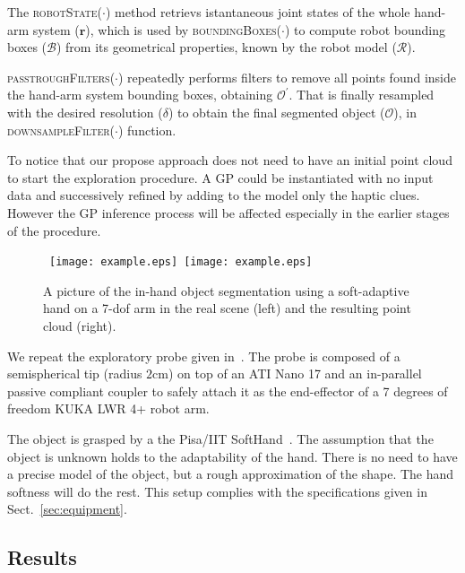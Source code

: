 The \textsc{robotState}($\cdot$) method retrievs istantaneous joint states
of the whole hand-arm system ($\mathbf{r}$), which is used by \textsc{boundingBoxes($\cdot$)} to compute robot bounding boxes ($\mathcal{B}$)
from its geometrical properties, known by the robot model ($\mathcal{R}$).

\textsc{passtroughFilters}($\cdot$) repeatedly performs filters to remove
all points found inside the hand-arm system bounding boxes, obtaining $\mathcal{O^\prime}$.
That is finally resampled with the desired resolution ($\delta$) 
to obtain the final segmented object ($\mathcal{O}$), in \textsc{downsampleFilter}($\cdot$) function.


To notice that our propose approach does not need to have an initial point cloud to start the exploration procedure. A GP could be instantiated with no input data and successively refined by adding to the model only the haptic clues. However the GP inference process will be affected especially in the earlier stages of the procedure.   

\begin{figure}
\centering
  \mbox{
  \texttt{[image: example.eps]}
  \texttt{[image: example.eps]}
  }
  \caption{A picture of the in-hand object segmentation using a soft-adaptive hand on a 7-dof arm in the real scene (left) and the resulting point cloud (right).}
  \label{fig:in-hand-segmentation}
\end{figure}

We repeat the exploratory probe given in~\citet{Rosales2014Active}. The probe is composed of a semispherical tip (radius $2$cm) on top of an ATI Nano 17 and an in-parallel passive compliant coupler to safely attach it as the end-effector of a 7 degrees of freedom KUKA LWR 4+ robot arm.

The object is grasped by a the Pisa/IIT SoftHand~\citet{Catalano2014Adaptive}. The assumption that the object is unknown holds to the adaptability of the hand.
There is no need to have a precise model of the object, but a rough approximation of the shape. The hand softness will do the rest. This setup complies with the specifications given in Sect.~\ref{sec:equipment}.



\subsection{Results}



\label{sec:results}
